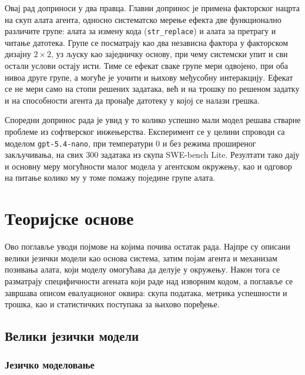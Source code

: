 \documentclass[12pt,a4paper]{report}
\begin{document}
	Овај рад доприноси у два правца. Главни допринос је примена факторског
	нацрта на скуп алата агента, односно систематско мерење ефекта две
	функционално различите групе: алата за измену кода
	(\texttt{str\_replace}) и алата за претрагу и читање датотека. Групе се
	посматрају као два независна фактора у факторском дизајну $2 \times 2$,
	уз љуску као заједничку основу, при чему системски упит и сви остали
	услови остају исти. Тиме се ефекат сваке групе мери одвојено, при оба нивоа
	друге групе, а могуће је уочити и њихову међусобну интеракцију. Ефекат се
	не мери само на стопи решених задатака, већ и на трошку по решеном задатку
	и на способности агента да пронађе датотеку у којој се налази грешка.

	Споредни допринос рада је увид у то колико успешно мали модел решава
	стварне проблеме из софтверског инжењерства. Експеримент се у целини
	спроводи са моделом \texttt{gpt-5.4-nano}, при температури 0 и без режима
	проширеног закључивања, на свих 300 задатака из скупа SWE-bench Lite.
	Резултати тако дају и основну меру могућности малог модела у агентском
	окружењу, као и одговор на питање колико му у томе помажу поједине групе
	алата.

	\chapter{Теоријске основе}
	
	Ово поглавље уводи појмове на којима почива остатак рада. Најпре су описани
	велики језички модели као основа система, затим појам агента и механизам
	позивања алата, који моделу омогућава да делује у окружењу. Након тога се
	разматрају специфичности агената који раде над изворним кодом, а поглавље
	се завршава описом евалуационог оквира: скупа података, метрика успешности
	и трошка, као и статистичких поступака за њихово поређење.

	\section{Велики језички модели}

	\subsection{Језичко моделовање}
\end{document}
